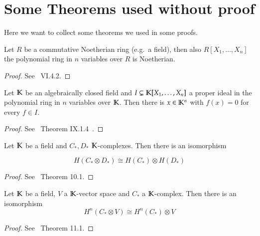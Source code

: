 \appendix
\section{Some Theorems used without proof}

Here we want to collect some theorems we used in some proofs.

\begin{Theorem}
\label{thm:HilbertBasisTheorem}
  Let $R$ be a commutative Noetherian ring (e.g.\ a field), then also $R[X_1, \ldots, X_n]$ the polynomial 
  ring in $n$ variables over $R$ is Noetherian.
\end{Theorem}
\begin{proof}
 See~\cite{Lang2002} VI.4.2.
\end{proof}



\begin{Theorem}
\label{thm:Nullstellensatz}
 Let $\mathbb{K}$ be an algebraically closed field and  $I \subsetneq \mathbb{K}[ X_1, \ldots, X_n]$ 
 a proper ideal in the polynomial ring in $n$ variables over $\mathbb{K}$. Then there is $x \in \mathbb{K}^n$
 with $f(x) = 0$ for every $f \in I$.
\end{Theorem}
\begin{proof}
 See~\cite{Lang2002} Theorem IX.1.4~.
\end{proof}


\begin{Theorem}
\label{thm:KünnethTheorem}
 
 Let $\mathbb{K}$ be a field and $C_* , D_*$ $\mathbb{K}$-complexes. Then there is an isomorphism
 
 $$H( C_* \otimes D_* ) \cong H(C_*) \otimes H(D_*)$$
 
\end{Theorem}
\begin{proof}
 See~\cite{MacLane1963} Theorem 10.1.
\end{proof}

\begin{Theorem}
\label{thm:Universalcoefficients}
 Let $\mathbb{K}$ be a field, $V$ a $\mathbb{K}$-vector space and $C_*$ a $\mathbb{K}$-complex. Then there is an isomorphism
 $$H^n(C_* \otimes V) \cong H^n(C_*) \otimes V$$
\end{Theorem}
\begin{proof}
 See~\cite{MacLane1963} Theorem 11.1.
\end{proof}
